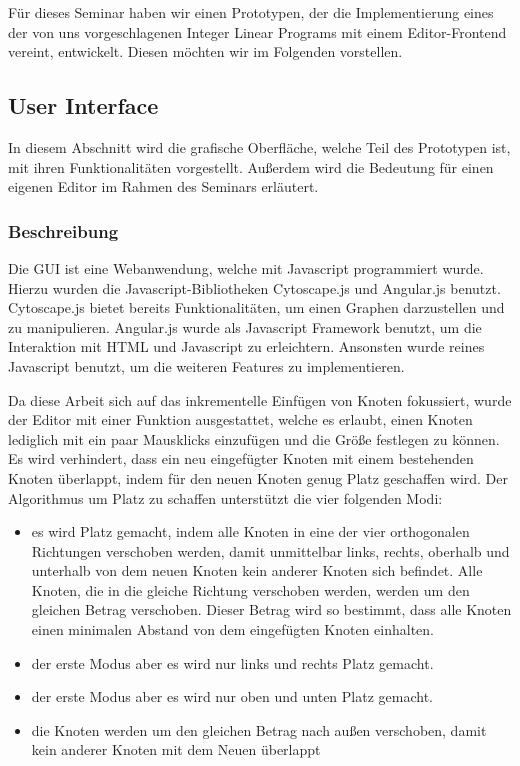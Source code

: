 Für dieses Seminar haben wir einen Prototypen, der die Implementierung eines der von uns vorgeschlagenen Integer Linear Programs mit einem Editor-Frontend vereint, entwickelt. Diesen möchten wir im Folgenden vorstellen.

\subsection{User Interface}

In diesem Abschnitt wird die grafische Oberfläche, welche Teil des Prototypen ist, mit ihren
Funktionalitäten vorgestellt. Außerdem wird die Bedeutung für einen eigenen Editor im
Rahmen des Seminars erläutert.

\subsubsection{Beschreibung}

Die GUI ist eine Webanwendung, welche mit Javascript programmiert wurde. Hierzu wurden
die Javascript-Bibliotheken Cytoscape.js\cite{cytoscape} und Angular.js\cite{angularjs} benutzt. Cytoscape.js bietet bereits
Funktionalitäten, um einen Graphen darzustellen und zu manipulieren. Angular.js wurde als
Javascript Framework benutzt, um die Interaktion mit HTML und Javascript zu erleichtern.
Ansonsten wurde reines Javascript benutzt, um die weiteren Features zu implementieren.

Da diese Arbeit sich auf das inkrementelle Einfügen von Knoten fokussiert, wurde der Editor
mit einer Funktion ausgestattet, welche es erlaubt, einen Knoten lediglich mit ein paar
Mausklicks einzufügen und die Größe festlegen zu können. Es wird verhindert, dass ein neu
eingefügter Knoten mit einem bestehenden Knoten überlappt, indem für den neuen Knoten
genug Platz geschaffen wird. Der Algorithmus um Platz zu schaffen unterstützt die vier
folgenden Modi:

\begin{itemize}
	\item es wird Platz gemacht, indem alle Knoten in eine der vier orthogonalen Richtungen
verschoben werden, damit unmittelbar links, rechts, oberhalb und unterhalb von dem
neuen Knoten kein anderer Knoten sich befindet. Alle Knoten, die in die gleiche
Richtung verschoben werden, werden um den gleichen Betrag verschoben. Dieser
Betrag wird so bestimmt, dass alle Knoten einen minimalen Abstand von dem
eingefügten Knoten einhalten.
	\item der erste Modus aber es wird nur links und rechts Platz gemacht.
	\item der erste Modus aber es wird nur oben und unten Platz gemacht.
	\item die Knoten werden um den gleichen Betrag nach außen verschoben, damit kein
anderer Knoten mit dem Neuen überlappt
\end{itemize}

